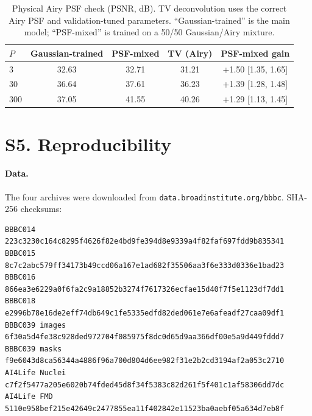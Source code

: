 \documentclass[11pt]{article}
\begin{document}
\begin{table}[h]
\centering
\caption{Physical Airy PSF check (PSNR, dB). TV deconvolution uses the correct
Airy PSF and validation-tuned parameters. ``Gaussian-trained'' is the main
model; ``PSF-mixed'' is trained on a 50/50 Gaussian/Airy mixture.}
\label{tab:airy}
\small
\begin{tabular}{lcccc}
\toprule
$P$ & Gaussian-trained & PSF-mixed & TV (Airy) & PSF-mixed gain \\
\midrule
3   & 32.63 & 32.71 & 31.21 & +1.50 [1.35, 1.65] \\
30  & 36.64 & 37.61 & 36.23 & +1.39 [1.28, 1.48] \\
300 & 37.05 & 41.55 & 40.26 & +1.29 [1.13, 1.45] \\
\bottomrule
\end{tabular}
\end{table}

\section*{S5. Reproducibility}
\paragraph{Data.}
The four archives were downloaded from
\texttt{data.broadinstitute.org/bbbc}. SHA-256 checksums:
{\footnotesize
\begin{verbatim}
BBBC014 223c3230c164c8295f4626f82e4bd9fe394d8e9339a4f82faf697fdd9b835341
BBBC015 8c7c2abc579ff34173b49ccd06a167e1ad682f35506aa3f6e333d0336e1bad23
BBBC016 866ea3e6229a0f6fa2c9a18852b3274f7617326ecfae15d40f7f5e1123df7dd1
BBBC018 e2996b78e16de2eff74db649c1fe5335edfd82ded061e7e6afeadf27caa09df1
BBBC039 images 6f30a5d4fe38c928ded972704f085975f8dc0d65d9aa366df00e5a9d449fddd7
BBBC039 masks  f9e6043d8ca56344a4886f96a700d804d6ee982f31e2b2cd3194af2a053c2710
AI4Life Nuclei c7f2f5477a205e6020b74fded45d8f34f5383c82d261f5f401c1af58306dd7dc
AI4Life FMD    5110e958bef215e42649c2477855ea11f402842e11523ba0aebf05a634d7eb8f
\end{verbatim}
}
\end{document}
